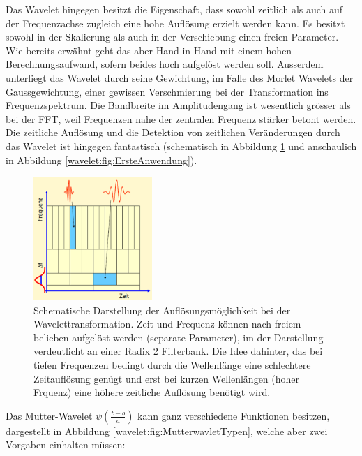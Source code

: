 Das Wavelet hingegen besitzt die Eigenschaft, dass sowohl zeitlich als auch auf der Frequenzachse zugleich eine hohe Auflösung erzielt werden kann. Es besitzt sowohl in der Skalierung als auch in der Verschiebung einen freien Parameter. Wie bereits erwähnt geht das aber Hand in Hand mit einem hohen Berechnungsaufwand, sofern beides hoch aufgelöst werden soll. Ausserdem unterliegt das Wavelet durch seine Gewichtung, im Falle des Morlet Wavelets der Gaussgewichtung, einer gewissen Verschmierung bei der Transformation ins Frequenzspektrum. Die Bandbreite im Amplitudengang ist wesentlich grösser als bei der FFT, weil Frequenzen nahe der zentralen Frequenz stärker betont werden. Die zeitliche Auflösung und die Detektion von zeitlichen Veränderungen durch das Wavelet ist hingegen fantastisch (schematisch in Abbildung \ref{wavelet:fig:CWTAufloesungRadix2} und anschaulich in Abbildung \ref{wavelet:fig:ErsteAnwendung}).

\begin{figure}
	\centering
	\includegraphics[width=0.4\textwidth]{papers/wavelets/images/6-3_CWTAufloesungRadix2.png}
	\caption{\cite{J.Mayer.2002} Schematische Darstellung der Auflösungsmöglichkeit bei der Wavelettransformation. Zeit und Frequenz können nach freiem belieben aufgelöst werden (separate Parameter), im der Darstellung verdeutlicht an einer Radix 2 Filterbank. Die Idee dahinter, das bei tiefen Frequenzen bedingt durch die Wellenlänge eine schlechtere Zeitauflösung genügt und erst bei kurzen Wellenlängen (hoher Frquenz) eine höhere zeitliche Auflösung benötigt wird.}
	\label{wavelet:fig:CWTAufloesungRadix2}
\end{figure}

Das Mutter-Wavelet $\psi\left(\frac{t-b}{a}\right)$ kann ganz verschiedene Funktionen besitzen, dargestellt in Abbildung \ref{wavelet:fig:MutterwavletTypen}, welche aber zwei Vorgaben einhalten müssen:

